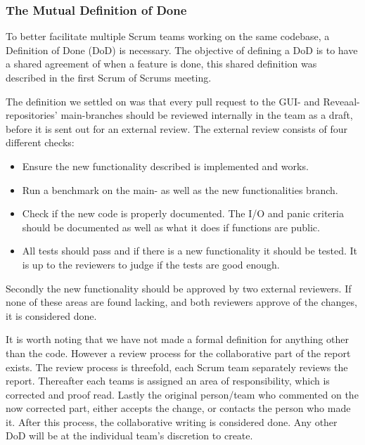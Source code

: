 \subsubsection{The Mutual Definition of Done}\label{common:collaboration:DoD}
To better facilitate multiple Scrum teams working on the same codebase, a Definition of Done (DoD) is necessary. The objective of defining a DoD is to have a shared agreement of when a feature is done, this shared definition was described in the first Scrum of Scrums meeting.

The definition we settled on was that every pull request to the GUI- and Reveaal-repositories' main-branches should be reviewed internally in the team as a draft, before it is sent out for an external review.
The external review consists of four different checks:
\begin{itemize}
    \item Ensure the new functionality described is implemented and works.
    \item Run a benchmark on the main- as well as the new functionalities branch.
    \item Check if the new code is properly documented. The I/O and panic criteria should be documented as well as what it does if functions are public.
    \item All tests should pass and if there is a new functionality it should be tested. It is up to the reviewers to judge if the tests are good enough.
\end{itemize}
Secondly the new functionality should be approved by two external reviewers.
If none of these areas are found lacking, and both reviewers approve of the changes, it is considered done.

It is worth noting that we have not made a formal definition for anything other than the code. However a review process for the collaborative part of the report exists. The review process is threefold, each Scrum team separately reviews the report. Thereafter each teams is assigned an area of responsibility, which is corrected and proof read. Lastly the original person/team who commented on the now corrected part, either accepts the change, or contacts the person who made it. After this process, the collaborative writing is considered done.
Any other DoD will be at the individual team's discretion to create.


